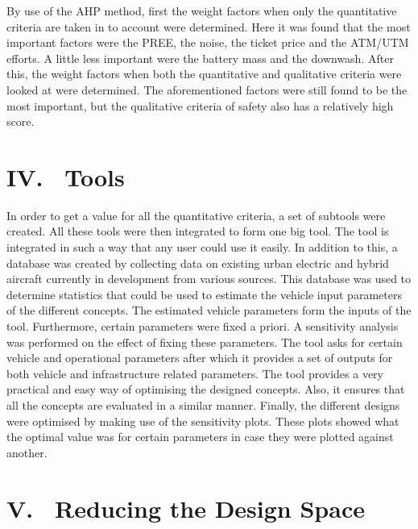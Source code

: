 By use of the AHP method, first the weight factors when only the quantitative criteria are taken in to account were determined. Here it was found that the most important factors were the PREE, the noise, the ticket price and the ATM/UTM efforts. A little less important were the battery mass and the downwash. After this, the weight factors when both the quantitative and qualitative criteria were looked at were determined. The aforementioned factors were still found to be the most important, but the qualitative criteria of safety also has a relatively high score.



\section*{IV. \ Tools}
\label{ES.Tools}


In order to get a value for all the quantitative criteria, a set of subtools were created. All these tools were then integrated to form one big tool. The tool is integrated in such a way that any user could use it easily. In addition to this, a database was created by collecting data on existing urban electric and hybrid aircraft currently in development from various sources. This database was used to determine statistics that could be used to estimate the vehicle input parameters of the different concepts. The estimated vehicle parameters form the inputs of the tool. Furthermore, certain parameters were fixed a priori. A sensitivity analysis was performed on the effect of fixing these parameters. The tool asks for certain vehicle and operational parameters after which it provides a set of outputs for both vehicle and infrastructure related parameters. The tool provides a very practical and easy way of optimising the designed concepts. Also, it ensures that all the concepts are evaluated in a similar manner. Finally, the different designs were optimised by making use of the sensitivity plots. These plots showed what the optimal value was for certain parameters in case they were plotted against another. 



\section*{V. \ Reducing the Design Space}
\label{ES.RedDS}

